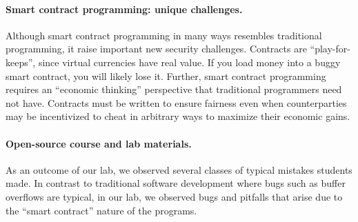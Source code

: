 \documentclass[10pt,twocolumn,letterpaper]{article}
\newcommand{\elaine}[1]{{\color{red}{[elaine: #1]}}}
\newcommand{\ignore}[1]{}
\begin{document}
\ignore{
The first part of this lab consists of step-by-step examples illustrating basic design of functional smart contracts. We highly recommend you take a hands-on approach, and interact with these smart contract examples using the Ethereum simulator! The accompanying materials to everything you need to get started with experimenting, including  a virtual machine image, basic instructions, and a language guide.

The second part of this lab focuses on designing smart contracts that achieve their intended goals, and are robust to attacks. 
Although our lab makes us of a simulator, the smart contracts you write can also be used in the live Ethereum network\footnote{At the time of this writing, the only live Ethereum network is a test network, since the main network has not yet launched.} The basic concepts we discuss apply to other cryptocurrencies as well (including Bitcoin), so most of what you learn will be transferable.
}

\paragraph{Smart contract programming: unique challenges.}
Although smart contract programming in many ways resembles 
traditional programming, 
it raise important new security challenges. 
Contracts are ``play-for-keeps'', since virtual currencies have real value. 
If you load money into a buggy smart contract, you will likely lose it. 
Further, smart contract programming requires
an ``economic thinking'' perspective that traditional
programmers need not have. 
Contracts must be written to ensure fairness even when
counterparties may be incentivized to cheat in arbitrary ways to maximize
their economic gains.

\elaine{say more about all parties being 
selfish, and may do malicious things to maximize its
financial gains.} 

\elaine{stress that even programming a very simple
game like rock paper scissors was difficult
and exposed many problems.}


\paragraph{Open-source course and lab materials.}
As an outcome of our lab, we observed several classes
of typical mistakes students made. 
In contrast to  
traditional software development where 
bugs such as buffer overflows are typical, 
in our lab, we observed 
bugs and pitfalls that arise due to 
the ``smart contract'' nature of the programs. 
\end{document}
